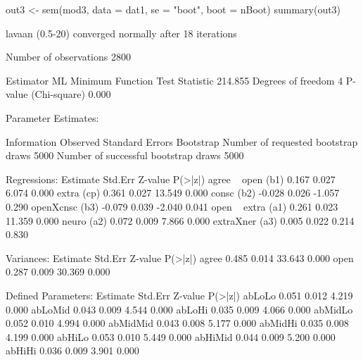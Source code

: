 \begin{Schunk}
\begin{Sinput}
 out3 <- sem(mod3, data = dat1, se = "boot", boot = nBoot)
 summary(out3)
\end{Sinput}
\begin{Soutput}
lavaan (0.5-20) converged normally after  18 iterations

  Number of observations                          2800

  Estimator                                         ML
  Minimum Function Test Statistic              214.855
  Degrees of freedom                                 4
  P-value (Chi-square)                           0.000

Parameter Estimates:

  Information                                 Observed
  Standard Errors                            Bootstrap
  Number of requested bootstrap draws             5000
  Number of successful bootstrap draws            5000

Regressions:
                   Estimate  Std.Err  Z-value  P(>|z|)
  agree ~                                             
    open      (b1)    0.167    0.027    6.074    0.000
    extra     (cp)    0.361    0.027   13.549    0.000
    consc     (b2)   -0.028    0.026   -1.057    0.290
    openXcnsc (b3)   -0.079    0.039   -2.040    0.041
  open ~                                              
    extra     (a1)    0.261    0.023   11.359    0.000
    neuro     (a2)    0.072    0.009    7.866    0.000
    extraXner (a3)    0.005    0.022    0.214    0.830

Variances:
                   Estimate  Std.Err  Z-value  P(>|z|)
    agree             0.485    0.014   33.643    0.000
    open              0.287    0.009   30.369    0.000

Defined Parameters:
                   Estimate  Std.Err  Z-value  P(>|z|)
    abLoLo            0.051    0.012    4.219    0.000
    abLoMid           0.043    0.009    4.544    0.000
    abLoHi            0.035    0.009    4.066    0.000
    abMidLo           0.052    0.010    4.994    0.000
    abMidMid          0.043    0.008    5.177    0.000
    abMidHi           0.035    0.008    4.199    0.000
    abHiLo            0.053    0.010    5.449    0.000
    abHiMid           0.044    0.009    5.200    0.000
    abHiHi            0.036    0.009    3.901    0.000
\end{Soutput}
\end{Schunk}
